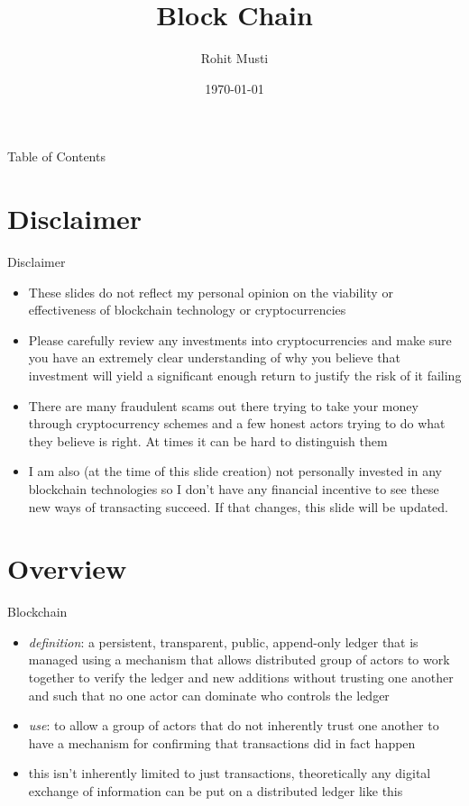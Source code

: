 \documentclass[handout]{beamer}
\title{Block Chain}
\author{Rohit Musti}
\institute{CUNY - Hunter College}
\date{\today}
\begin{document}
 
\frame{\titlepage}

\begin{frame}{Table of Contents}
  \tableofcontents
\end{frame}

\section{Disclaimer}

\begin{frame}{Disclaimer}
    \begin{itemize}
        \item \pause These slides do not reflect my personal opinion on the viability or effectiveness of blockchain technology or cryptocurrencies
        \item \pause Please carefully review any investments into cryptocurrencies and make sure you have an extremely clear understanding of why you believe that investment will yield a significant enough return to justify the risk of it failing
        \item \pause There are many fraudulent scams out there trying to take your money through cryptocurrency schemes and a few honest actors trying to do what they believe is right. At times it can be hard to distinguish them
        \item \pause I am also (at the time of this slide creation) not personally invested in any blockchain technologies so I don't have any financial incentive to see these new ways of transacting succeed. If that changes, this slide will be updated.
    \end{itemize}
\end{frame}

\section{Overview}

\begin{frame}{Blockchain}
    \begin{itemize}
        \item \pause \textit{definition}: a persistent, transparent, public, append-only ledger that is managed using a mechanism that allows distributed group of actors to work together to verify the ledger and new additions without trusting one another and such that no one actor can dominate who controls the ledger
        \item \pause \textit{use}: to allow a group of actors that do not inherently trust one another to have a mechanism for confirming that transactions did in fact happen
        \item \pause this isn't inherently limited to just transactions, theoretically any digital exchange of information can be put on a distributed ledger like this
    \end{itemize}
\end{frame}
\end{document}
